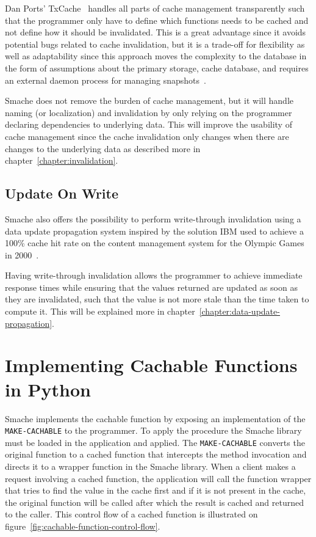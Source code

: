 Dan Ports' TxCache~\cite{paper:liskov} handles all parts of cache management transparently such that the programmer only have to define which functions needs to be cached and not define how it should be invalidated. This is a great advantage since it avoids potential bugs related to cache invalidation, but it is a trade-off for flexibility as well as adaptability since this approach moves the complexity to the database in the form of assumptions about the primary storage, cache database, and requires an external daemon process for managing snapshots~\cite{paper:liskov}.

Smache does not remove the burden of cache management, but it will handle naming (or localization) and invalidation by only relying on the programmer declaring dependencies to underlying data. This will improve the usability of cache management since the cache invalidation only changes when there are changes to the underlying data as described more in chapter~\ref{chapter:invalidation}.


\subsection{Update On Write}
\label{subsec:write-through-updates}

Smache also offers the possibility to perform write-through invalidation using a data update propagation system inspired by the solution IBM used to achieve a 100\% cache hit rate on the content management system for the Olympic Games in 2000~\cite{paper:ibm, paper:ibm-extended}.

Having write-through invalidation allows the programmer to achieve immediate response times while ensuring that the values returned are updated as soon as they are invalidated, such that the value is not more stale than the time taken to compute it. This will be explained more in chapter~\ref{chapter:data-update-propagation}.


\section{Implementing Cachable Functions in Python}
\label{sec:implementing_cachable_functions_in_python}

Smache implements the cachable function by exposing an implementation of the \verb$MAKE-CACHABLE$ to the programmer. To apply the procedure the Smache library must be loaded in the application and applied. The \verb$MAKE-CACHABLE$ converts the original function to a cached function that intercepts the method invocation and directs it to a wrapper function in the Smache library. When a client makes a request involving a cached function, the application will call the function wrapper that tries to find the value in the cache first and if it is not present in the cache, the original function will be called after which the result is cached and returned to the caller. This control flow of a cached function is illustrated on figure~\ref{fig:cachable-function-control-flow}.

